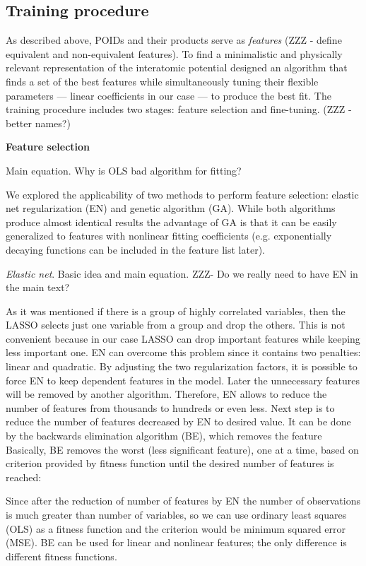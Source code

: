 \documentclass[aps,prl,reprint,amsmath,amssymb,nature]{revtex4-1}
\begin{document}
\subsection{Training procedure} 

As described above, POIDs and their products serve as \textit{features} (ZZZ - define equivalent and non-equivalent features). 
To find a minimalistic and physically relevant representation of the interatomic potential designed an algorithm that finds a set of the best features while simultaneously tuning their flexible parameters --- linear coefficients in our case --- to produce the best fit. 
The training procedure includes two stages: feature selection and fine-tuning. (ZZZ - better names?)

\textbf{Feature selection}

Main equation. Why is OLS bad algorithm for fitting?

We explored the applicability of two methods to perform feature selection: elastic net regularization (EN) and genetic algorithm (GA). 
While both algorithms produce almost identical results the advantage of GA is that it can be easily generalized to features with nonlinear fitting coefficients (e.g. exponentially decaying functions can be included in the feature list later).

\textit{Elastic net}. Basic idea and main equation. ZZZ- Do we really need to have EN in the main text?

As it was mentioned if there is a group of highly correlated variables, 
then the LASSO selects just one variable from a group and drop the 
others. This is not convenient because in our case LASSO can drop 
important features while keeping less important one. EN can overcome 
this problem since it contains two penalties: linear and quadratic. By 
adjusting the two regularization factors, it is possible to force EN to 
keep dependent features in the model. Later the unnecessary features 
will be removed by another algorithm. Therefore, EN allows to reduce the 
number of features from thousands to hundreds or even less. Next step is 
to reduce the number of features decreased by EN to desired value. It 
can be done by the backwards elimination algorithm (BE), which removes 
the feature Basically, BE removes the worst (less significant feature), 
one at a time, based on criterion provided by fitness function until the desired number of features is reached:

Since after the reduction of number of features by EN the number of 
observations is much greater than number of variables, so we can use 
ordinary least squares (OLS) as a fitness function and the criterion 
would be minimum squared error (MSE). BE can be used for linear and 
nonlinear features; the only difference is different fitness functions.
\end{document}

